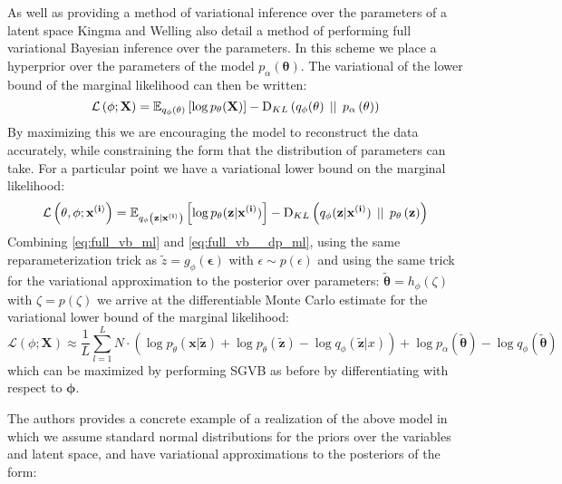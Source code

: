 \documentclass[../report.tex]{subfiles}
\begin{document}
As well as providing a method of variational inference over the parameters of a latent space Kingma and Welling also detail a method of performing full variational Bayesian inference over the parameters. In this scheme we place a hyperprior over the parameters of the model $p_\alpha(\mathbf{\theta})$. The variational of the lower bound of the marginal likelihood can then be written:
\begin{equation}
\mathcal{L} \left( \mathbf{\phi}; \mathbf{X}\right)=\mathbb{E}_{q_\phi \left( \theta\right)} \left[ \log p_\mathbf{\theta}(\mathbf{X}) \right] - \textrm{D}_{KL} \left( q_\phi(\mathbf{\theta}) \, \mid \mid \, p_\mathbf{\alpha} \left( \mathbf{\theta}\right)\right)
\label{eq:full_vb_ml}
\end{equation}
By maximizing this we are encouraging the model to reconstruct the data accurately, while constraining the form that the distribution of parameters can take. For a particular point we have a variational lower bound on the marginal likelihood:
\begin{equation}
\mathcal{L} \left( \mathbf{\theta}, \mathbf{\phi}; \mathbf{x^{(i)}}\right) =\mathbb{E}_{q_\phi \left( \mathbf{z} | \mathbf{x^{(i)}}\right)} \left[ \log p_\mathbf{\theta}(\mathbf{z} | \mathbf{x^{(i)}}) \right] - \textrm{D}_{KL} \left( q_\phi(\mathbf{z} | \mathbf{x^{(i)}}) \, \mid \mid \, p_\mathbf{\theta} \left( \mathbf{z}\right)\right)
\label{eq:full_vb__dp_ml}
\end{equation}
Combining \cref{eq:full_vb_ml} and \cref{eq:full_vb__dp_ml}, using the same reparameterization trick as $\tilde{z}=g_{\phi}(\mathbf{\epsilon})$ with $\epsilon \sim p(\epsilon)$ and using the same trick for the variational approximation to the posterior over parameters: $\tilde{\mathbf{\theta}} = h_\phi(\zeta)$ with $\zeta = p(\zeta)$ we arrive at the differentiable Monte Carlo estimate for the variational lower bound of the marginal likelihood:
\begin{equation}
\mathcal{L}(\phi; \mathbf{X}) \approx \frac{1}{L}\sum_{l=1}^{L} N\cdot(\log p_{\tilde{\theta}}(\mathbf{x} | \mathbf{\tilde{z}})
 + \log p_{\tilde{\theta}}(\tilde{\mathbf{z}}) - 
 \log q_\phi(\mathbf{\tilde{z}} | x)) + \log p_\alpha(\mathbf{\tilde{\theta}}) - \log q_\phi(\mathbf{\tilde{\theta}})
 \label{eq:fvb_mc_approx}
\end{equation}
which can be maximized by performing SGVB as before by differentiating with respect to $\mathbf{\phi}$.

The authors provides a concrete example of a realization of the above model in which we assume standard normal distributions for the priors over the variables and latent space, and have variational approximations to the posteriors of the form:
\end{document}
